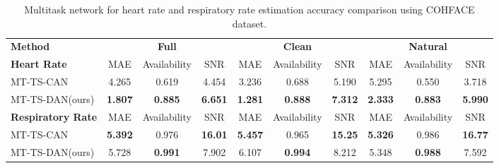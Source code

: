 \documentclass[conference]{IEEEtran}
\begin{document}
\begin{table*}[htbp]
\centering
\caption{Multitask network for heart rate and respiratory rate estimation accuracy comparison using COHFACE dataset.}
\begin{tabular}{lccc|ccc|ccc}
\hline\noalign{\smallskip}
\bf{Method} & \multicolumn{3}{c}{\bf{Full}}  &  \multicolumn{3}{c}{\bf{Clean}} & \multicolumn{3}{c}{\bf{Natural}}\\
\noalign{\smallskip}
\hline
\noalign{\smallskip}
\textbf{Heart Rate} & MAE & Availability & SNR & MAE & Availability & SNR & MAE & Availability & SNR\\
MT-TS-CAN\cite{liu2020multi}  &4.265&0.619&4.454&3.236&0.688&5.190&5.295&0.550&3.718   \\
MT-TS-DAN(ours)&\textbf{1.807}&\textbf{0.885}&\textbf{6.651}&\textbf{1.281}&\textbf{0.888}&\textbf{7.312}&\textbf{2.333}&\textbf{0.883}&\textbf{5.990}\\
\hline
\textbf{Respiratory Rate} &  MAE & Availability & SNR & MAE & Availability & SNR & MAE & Availability & SNR\\
MT-TS-CAN\cite{liu2020multi} &\textbf{5.392}&0.976&\textbf{16.01}&\textbf{5.457}&0.965&\textbf{15.25}&\textbf{5.326}&0.986&\textbf{16.77}  \\ %
MT-TS-DAN(ours) &5.728&\textbf{0.991}&7.902&6.107&\textbf{0.994}&8.212&5.348&\textbf{0.988}&7.592\\
\hline
\end{tabular}

\label{cohface}
\end{table*}
\end{document}
